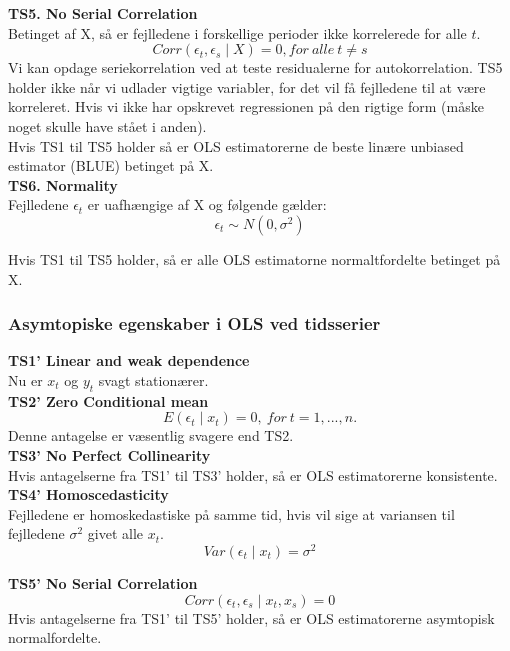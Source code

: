 \documentclass[
  10pt,
]{article}
\begin{document}
\textbf{TS5. No Serial Correlation }\\
Betinget af X, så er fejlledene i forskellige perioder ikke korrelerede
for alle \(t\).
\[Corr(\epsilon_t, \epsilon_s\mid X) = 0, for\ alle\ t \neq s \] Vi kan
opdage seriekorrelation ved at teste residualerne for autokorrelation.
TS5 holder ikke når vi udlader vigtige variabler, for det vil få
fejlledene til at være korreleret. Hvis vi ikke har opskrevet
regressionen på den rigtige form (måske noget skulle have stået i
anden).\\
Hvis TS1 til TS5 holder så er OLS estimatorerne de beste linære unbiased
estimator (BLUE) betinget på X.\\

\textbf{TS6. Normality}\\
Fejlledene \(\epsilon_t\) er uafhængige af X og følgende gælder:
\[\epsilon_t \sim N(0,\sigma^2) \]

Hvis TS1 til TS5 holder, så er alle OLS estimatorne normaltfordelte
betinget på X.

\hypertarget{asymtopiske-egenskaber-i-ols-ved-tidsserier}{%
\subsubsection{Asymtopiske egenskaber i OLS ved
tidsserier}\label{asymtopiske-egenskaber-i-ols-ved-tidsserier}}

\textbf{TS1' Linear and weak dependence}\\
Nu er \(x_t\) og \(y_t\) svagt stationærer.\\

\textbf{TS2' Zero Conditional mean}\\
\[E(\epsilon_t \mid x_t) = 0, \ for\ t = 1, ... , n. \] Denne antagelse
er væsentlig svagere end TS2.\\

\textbf{TS3' No Perfect Collinearity}\\
Hvis antagelserne fra TS1' til TS3' holder, så er OLS estimatorerne
konsistente.\\

\textbf{TS4' Homoscedasticity}\\
Fejlledene er homoskedastiske på samme tid, hvis vil sige at variansen
til fejlledene \(\sigma^2\) givet alle \(x_t\).
\[Var(\epsilon_t \mid x_t) = \sigma^2 \]

\textbf{TS5' No Serial Correlation}\\
\[Corr(\epsilon_t, \epsilon_s \mid x_t, x_s) = 0 \] Hvis antagelserne
fra TS1' til TS5' holder, så er OLS estimatorerne asymtopisk
normalfordelte.
\end{document}
